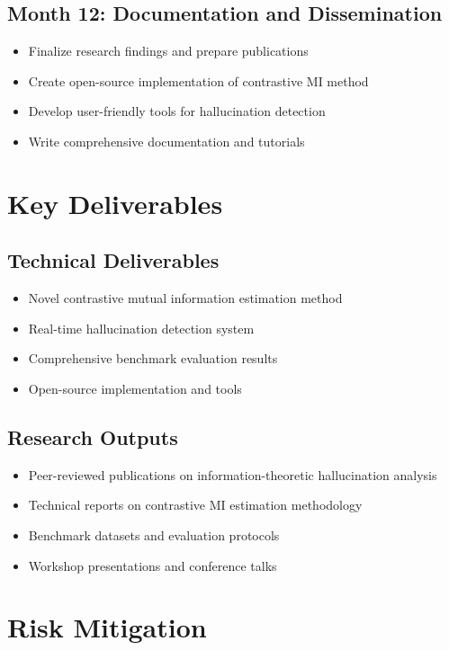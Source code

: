\documentclass[11pt, oneside]{book}
\theoremstyle{plain}
\theoremstyle{definition}
\theoremstyle{remark}
\begin{document}
\subsection{Month 12: Documentation and Dissemination}
\begin{itemize}
    \item Finalize research findings and prepare publications
    \item Create open-source implementation of contrastive MI method
    \item Develop user-friendly tools for hallucination detection
    \item Write comprehensive documentation and tutorials
\end{itemize}

\section{Key Deliverables}

\subsection{Technical Deliverables}
\begin{itemize}
    \item Novel contrastive mutual information estimation method
    \item Real-time hallucination detection system
    \item Comprehensive benchmark evaluation results
    \item Open-source implementation and tools
\end{itemize}

\subsection{Research Outputs}
\begin{itemize}
    \item Peer-reviewed publications on information-theoretic hallucination analysis
    \item Technical reports on contrastive MI estimation methodology
    \item Benchmark datasets and evaluation protocols
    \item Workshop presentations and conference talks
\end{itemize}

\section{Risk Mitigation}
\end{document}
